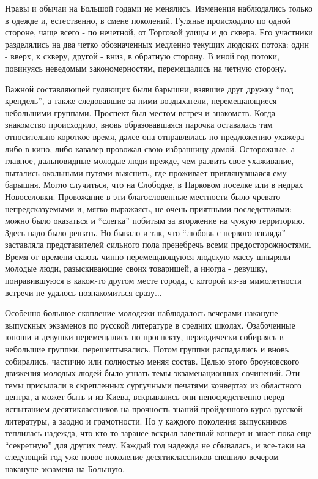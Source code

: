 Нравы и обычаи на Большой годами не менялись. Изменения наблюдались только в
одежде и, естественно, в смене поколений. Гулянье происходило по одной стороне,
чаще всего - по нечетной, от Торговой улицы и до сквера. Его участники
разделялись на два четко обозначенных медленно текущих людских потока: один -
вверх, к скверу, другой - вниз, в обратную сторону. В иной год потоки,
повинуясь неведомым закономерностям, перемещались на четную сторону.


Важной составляющей гуляющих были барышни, взявшие друг дружку \enquote{под крендель},
а также следовавшие за ними воздыхатели, перемещающиеся небольшими группами.
Проспект был местом встреч и знакомств. Когда знакомство происходило, вновь
образовавшаяся парочка оставалась там относительно короткое время, далее она
отправлялась по предложению ухажера либо в кино, либо кавалер провожал свою
избранницу домой. Осторожные, а главное, дальновидные молодые люди прежде, чем
развить свое ухаживание, пытались окольными путями выяснить, где проживает
приглянувшаяся ему барышня. Могло случиться, что на Слободке, в Парковом
поселке или в недрах Новоселовки. Провожание в эти благословенные местности
было чревато непредсказуемыми и, мягко выражаясь, не очень приятными
последствиями: можно было оказаться и \enquote{слегка} побитым за вторжение на чужую
территорию. Здесь надо было решать. Но бывало и так, что \enquote{любовь с первого
взгляда} заставляла представителей сильного пола пренебречь всеми
предосторожностями. Время от времени сквозь чинно перемещающуюся людскую массу
шныряли молодые люди, разыскивающие своих товарищей, а иногда - девушку,
понравившуюся в каком-то другом месте города, с которой из-за мимолетности
встречи не удалось познакомиться сразу...

Особенно большое скопление молодежи наблюдалось вечерами накануне выпускных
экзаменов по русской литературе в средних школах. Озабоченные юноши и девушки
перемещались по проспекту, периодически собираясь в небольшие группки,
перешептывались. Потом группки распадались и вновь собирались, частично или
полностью меняя состав. Целью этого броуновского движения молодых людей было
узнать темы экзаменационных сочинений. Эти темы присылали в скрепленных
сургучными печатями конвертах из областного центра, а может быть и из Киева,
вскрывались они непосредственно перед испытанием десятиклассников на прочность
знаний пройденного курса русской литературы, а заодно и грамотности. Но у
каждого поколения выпускников теплилась надежда, что кто-то заранее вскрыл
заветный конверт и знает пока еще \enquote{секретную} для других тему. Каждый год
надежда не сбывалась, и все-таки на следующий год уже новое поколение
десятиклассников спешило вечером накануне экзамена на Большую.


